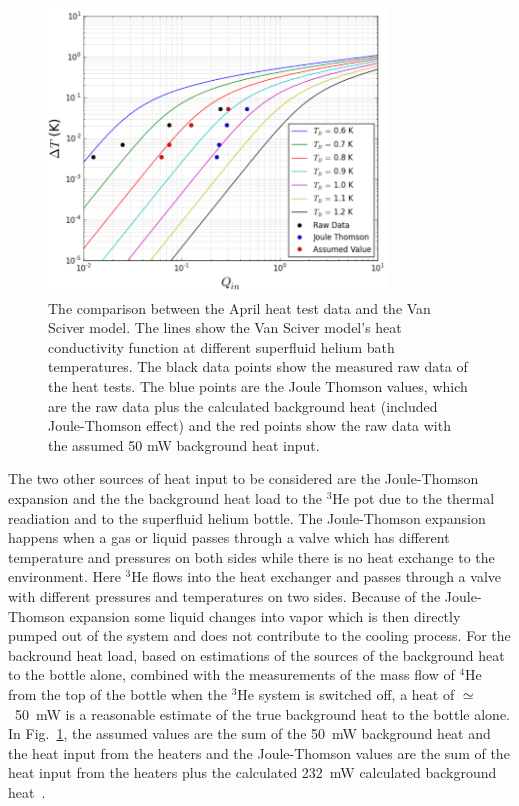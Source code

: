 \begin{figure}[h!]
  \centering \includegraphics[width=0.8\textwidth]{April_Data.png}
  \caption{The comparison between the April heat test data and the Van
    Sciver model. The lines show the Van Sciver model's heat
    conductivity function at different superfluid helium bath
    temperatures. The black data points show the measured raw data of
    the heat tests. The blue points are the Joule Thomson values,
    which are the raw data plus the calculated background heat
    (included Joule-Thomson effect) and the red points show the raw
    data with the assumed 50 mW background heat input. }
\label{fig:April_Data}
\end{figure}


The two other sources of heat input to be considered are the
Joule-Thomson expansion and the the background heat load to the $^3$He
pot due to the thermal readiation and to the superfluid helium
bottle. The Joule-Thomson expansion happens when a gas or liquid
passes through a valve which has different temperature and pressures
on both sides while there is no heat exchange to the environment. Here
$^3$He flows into the heat exchanger and passes through a valve with
different pressures and temperatures on two sides. Because of the
Joule-Thomson expansion some liquid changes into vapor which is then
directly pumped out of the system and does not contribute to the
cooling process. For the backround heat load, based on estimations of
the sources of the background heat to the bottle alone, combined with
the measurements of the mass flow of $^4$He from the top of the bottle
when the $^3$He system is switched off, a heat of $\simeq$~50~mW is a
reasonable estimate of the true background heat to the bottle
alone. In Fig.~\ref{fig:April_Data}, the assumed values are the sum of
the 50~mW background heat and the heat input from the heaters and the
Joule-Thomson values are the sum of the heat input from the heaters
plus the calculated 232~mW calculated background
heat~\cite{Florian_thesis}.



